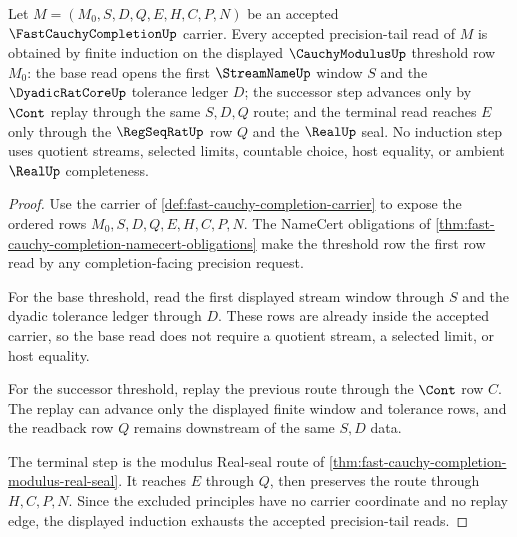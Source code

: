 \begin{theorem}
\label{thm:fast-cauchy-completion-induction}
Let $M=(M_0,S,D,Q,E,H,C,P,N)$ be an accepted $\FastCauchyCompletionUp$ carrier. Every accepted precision-tail read of $M$ is obtained by finite induction on the displayed $\CauchyModulusUp$ threshold row $M_0$: the base read opens the first $\StreamNameUp$ window $S$ and the $\DyadicRatCoreUp$ tolerance ledger $D$; the successor step advances only by $\Cont$ replay through the same $S,D,Q$ route; and the terminal read reaches $E$ only through the $\RegSeqRatUp$ row $Q$ and the $\RealUp$ seal. No induction step uses quotient streams, selected limits, countable choice, host equality, or ambient $\RealUp$ completeness.
\end{theorem}
\begin{proof}
Use the carrier of \autoref{def:fast-cauchy-completion-carrier} to expose the ordered rows $M_0,S,D,Q,E,H,C,P,N$. The NameCert obligations of \autoref{thm:fast-cauchy-completion-namecert-obligations} make the threshold row the first row read by any completion-facing precision request.

For the base threshold, read the first displayed stream window through $S$ and the dyadic tolerance ledger through $D$. These rows are already inside the accepted carrier, so the base read does not require a quotient stream, a selected limit, or host equality.

For the successor threshold, replay the previous route through the $\Cont$ row $C$. The replay can advance only the displayed finite window and tolerance rows, and the readback row $Q$ remains downstream of the same $S,D$ data.

The terminal step is the modulus Real-seal route of \autoref{thm:fast-cauchy-completion-modulus-real-seal}. It reaches $E$ through $Q$, then preserves the route through $H,C,P,N$. Since the excluded principles have no carrier coordinate and no replay edge, the displayed induction exhausts the accepted precision-tail reads.
\end{proof}

